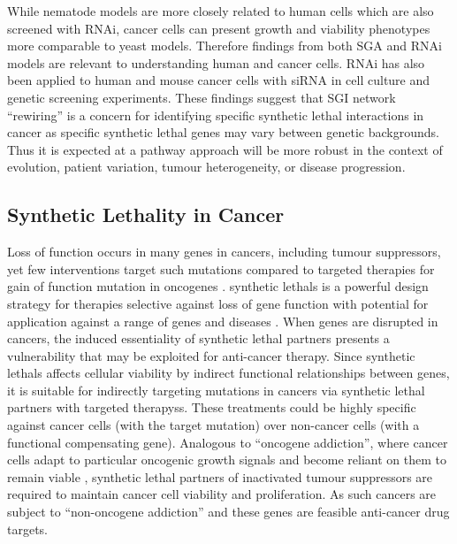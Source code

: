 While nematode models are more closely related to human cells which are also screened with \gls{RNAi}, cancer cells can present growth and viability phenotypes more comparable to yeast models. Therefore findings from both \gls{SGA} and \gls{RNAi} models are relevant to understanding human and cancer cells. \gls{RNAi} has also been applied to human and mouse cancer cells with \acrfull{siRNA} in cell culture and genetic screening experiments. These findings suggest that \gls{SGI} network ``rewiring'' is a concern for identifying specific \gls{synthetic lethal} interactions in cancer as specific \gls{synthetic lethal} genes may vary between genetic backgrounds. Thus it is expected at a \gls{pathway} approach will be more robust in the context of evolution, patient variation, tumour heterogeneity, or disease progression.  

\subsection{Synthetic Lethality in Cancer}

Loss of function occurs in many genes in cancers, including \glspl{tumour suppressor}, yet few interventions target such \glspl{mutation} compared to targeted therapies for gain of function \gls{mutation} in \glspl{oncogene} \citep{Kaelin2005}. \Glspl{synthetic lethal} is a powerful design strategy for therapies selective against loss of gene function with potential for application against a range of genes and diseases \citep{Kaelin2009, Fece2015}. When genes are disrupted in cancers, the \gls{induced essentiality} of \gls{synthetic lethal} partners presents a vulnerability that may be exploited for anti-cancer therapy. Since \glspl{synthetic lethal} affects cellular viability by indirect functional relationships between genes, it is suitable for indirectly targeting \glspl{mutation} in cancers via \gls{synthetic lethal} partners with \glspl{targeted therapy}s. These treatments could be highly specific against cancer cells (with the target \gls{mutation}) over non-cancer cells (with a functional compensating gene). Analogous to ``\gls{oncogene addiction}'', where cancer cells adapt to particular oncogenic growth signals and become reliant on them to remain viable \citep{Luo2009, Weinstein2000}, \gls{synthetic lethal} partners of inactivated \glspl{tumour suppressor} are required to maintain cancer cell viability and proliferation. As such cancers are subject to ``\gls{non-oncogene addiction}'' and these genes are feasible anti-cancer drug targets. 


